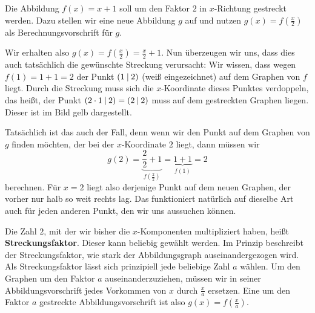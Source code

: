 \documentclass[../../main.tex]{subfiles}
\begin{document}
\begin{example}{}

    Die Abbildung $f(x)=x+1$ soll um den Faktor $2$ in $x$-Richtung gestreckt werden. Dazu stellen wir eine neue Abbildung $g$ auf und nutzen $g(x)=f(\frac{x}{2})$ als Berechnungsvorschrift für $g$.
    
    Wir erhalten also $g(x)=f(\frac{x}{2})=\frac{x}{2}+1$. Nun überzeugen wir uns, dass dies auch tatsächlich die gewünschte Streckung verursacht: Wir wissen, dass wegen $f(1)=1+1=2$ der Punkt $\left(1 \:\middle|\: 2\right)$ (weiß eingezeichnet) auf dem Graphen von $f$ liegt. Durch die Streckung muss sich die $x$-Koordinate dieses Punktes verdoppeln, das heißt, der Punkt $\left(2\cdot 1 \:\middle|\: 2\right)=\left(2 \:\middle|\: 2\right)$ muss auf dem gestreckten Graphen liegen. Dieser ist im Bild gelb dargestellt.
    
    Tatsächlich ist das auch der Fall, denn wenn wir den Punkt auf dem Graphen von $g$ finden möchten, der bei der $x$-Koordinate $2$ liegt, dann müssen wir
    \[g(2)=\underbrace{\frac{2}{2}+1}_{f(\frac{2}{2})}=\underbrace{1+1}_{f(1)}=2\] 
    berechnen. Für $x=2$ liegt also derjenige Punkt auf dem neuen Graphen, der vorher nur halb so weit rechts lag. Das funktioniert natürlich auf dieselbe Art auch für jeden anderen Punkt, den wir uns aussuchen können.
\end{example}

Die Zahl $2$, mit der wir bisher die $x$-Komponenten multipliziert haben, heißt \textbf{Streckungsfaktor}. Dieser kann beliebig gewählt werden. Im Prinzip beschreibt der Streckungsfaktor, wie stark der Abbildungsgraph auseinandergezogen wird. Als Streckungsfaktor lässt sich prinzipiell jede beliebige Zahl $a$ wählen. Um den Graphen um den Faktor $a$ auseinanderzuziehen, müssen wir in seiner Abbildungsvorschrift jedes Vorkommen von $x$ durch $\frac{x}{a}$ ersetzen. Eine um den Faktor $a$ gestreckte Abbildungsvorschrift ist also $g(x)=f(\frac{x}{a})$.
\end{document}
